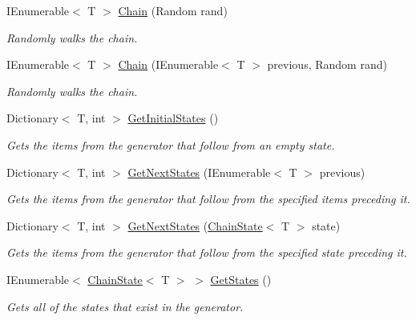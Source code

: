 \begin{DoxyCompactItemize}
I\+Enumerable$<$ T $>$ \mbox{\hyperlink{class_markov_1_1_markov_chain_a5d82b8169c681429fe8705b83bcb381e}{Chain}} (Random rand)
\begin{DoxyCompactList}\small\item\em Randomly walks the chain. \end{DoxyCompactList}\item 
I\+Enumerable$<$ T $>$ \mbox{\hyperlink{class_markov_1_1_markov_chain_a380daf4363822c659489862de2154dc1}{Chain}} (I\+Enumerable$<$ T $>$ previous, Random rand)
\begin{DoxyCompactList}\small\item\em Randomly walks the chain. \end{DoxyCompactList}\item 
Dictionary$<$ T, int $>$ \mbox{\hyperlink{class_markov_1_1_markov_chain_a5c19f54cdeff94bd0041fad4ba4c7c9e}{Get\+Initial\+States}} ()
\begin{DoxyCompactList}\small\item\em Gets the items from the generator that follow from an empty state. \end{DoxyCompactList}\item 
Dictionary$<$ T, int $>$ \mbox{\hyperlink{class_markov_1_1_markov_chain_aa9bf95df2986fff7d75c0c8489a0eab5}{Get\+Next\+States}} (I\+Enumerable$<$ T $>$ previous)
\begin{DoxyCompactList}\small\item\em Gets the items from the generator that follow from the specified items preceding it. \end{DoxyCompactList}\item 
Dictionary$<$ T, int $>$ \mbox{\hyperlink{class_markov_1_1_markov_chain_a124133e485b50cae03d205b5fcffcdb1}{Get\+Next\+States}} (\mbox{\hyperlink{class_markov_1_1_chain_state}{Chain\+State}}$<$ T $>$ state)
\begin{DoxyCompactList}\small\item\em Gets the items from the generator that follow from the specified state preceding it. \end{DoxyCompactList}\item 
I\+Enumerable$<$ \mbox{\hyperlink{class_markov_1_1_chain_state}{Chain\+State}}$<$ T $>$ $>$ \mbox{\hyperlink{class_markov_1_1_markov_chain_a5875741ce2c4fb9cb3d2242cac166167}{Get\+States}} ()
\begin{DoxyCompactList}\small\item\em Gets all of the states that exist in the generator. \end{DoxyCompactList}\item 

\end{DoxyCompactItemize}
